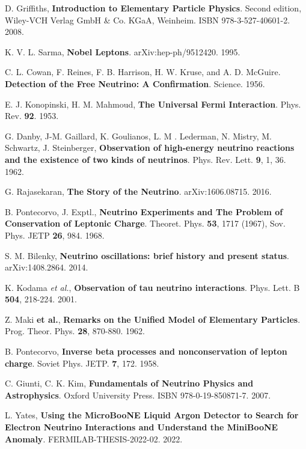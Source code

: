  D. Griffiths, \textbf{Introduction to Elementary Particle Physics}. Second edition, Wiley-VCH Verlag GmbH \& Co. KGaA, Weinheim. ISBN 978-3-527-40601-2. 2008.

 K. V. L. Sarma, \textbf{Nobel Leptons}. arXiv:hep-ph/9512420. 1995.

 C. L. Cowan, F. Reines, F. B. Harrison, H. W. Kruse, and A. D. McGuire. \textbf{Detection of the Free Neutrino: A Confirmation}. Science. 1956.

 E. J. Konopinski, H. M. Mahmoud, \textbf{The Universal Fermi Interaction}. Phys. Rev. \textbf{92}. 1953.

 G. Danby, J-M. Gaillard, K. Goulianos, L. M . Lederman, N. Mistry, M. Schwartz, J. Steinberger, \textbf{Observation of high-energy neutrino reactions and the existence of two kinds of neutrinos}. Phys. Rev. Lett. \textbf{9}, 1, 36. 1962.

 G. Rajasekaran, \textbf{The Story of the Neutrino}. arXiv:1606.08715. 2016.

 B. Pontecorvo, J. Exptl., \textbf{Neutrino Experiments and The Problem of Conservation of Leptonic Charge}. Theoret. Phys. \textbf{53}, 1717 (1967), Sov. Phys. JETP \textbf{26}, 984. 1968.

 S. M. Bilenky, \textbf{Neutrino oscillations: brief history and present status}. arXiv:1408.2864. 2014.

K. Kodama \textit{et al.}, \textbf{Observation of tau neutrino interactions}. Phys. Lett. B \textbf{504}, 218-224. 2001. 

 Z. Maki \textbf{et al.}, \textbf{Remarks on the Unified Model of Elementary Particles}. Prog. Theor. Phys. \textbf{28}, 870-880. 1962.

 B. Pontecorvo, \textbf{Inverse beta processes and nonconservation of lepton charge}. Soviet Phys. JETP. \textbf{7}, 172. 1958.

 C. Giunti, C. K. Kim, \textbf{Fundamentals of Neutrino Physics and Astrophysics}. Oxford University Press. ISBN 978-0-19-850871-7. 2007.

 L. Yates, \textbf{Using the MicroBooNE Liquid Argon Detector
to Search for Electron Neutrino Interactions and Understand the MiniBooNE Anomaly}. FERMILAB-THESIS-2022-02. 2022.

